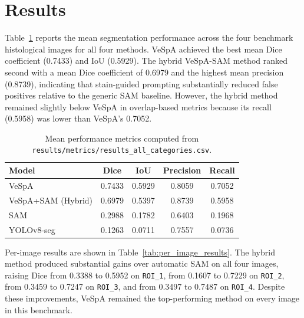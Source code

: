 \section{Results}

Table~\ref{tab:summary_metrics} reports the mean segmentation performance across the four benchmark histological images for all four methods. VeSpA achieved the best mean Dice coefficient (0.7433) and IoU (0.5929). The hybrid VeSpA-SAM method ranked second with a mean Dice coefficient of 0.6979 and the highest mean precision (0.8739), indicating that stain-guided prompting substantially reduced false positives relative to the generic SAM baseline. However, the hybrid method remained slightly below VeSpA in overlap-based metrics because its recall (0.5958) was lower than VeSpA's 0.7052.

\begin{table}[htbp]
\centering
\caption{Mean performance metrics computed from \texttt{results/metrics/results\_all\_categories.csv}.}
\label{tab:summary_metrics}
\begin{tabular}{lcccc}
\hline
Model & Dice & IoU & Precision & Recall \\
\hline
VeSpA & 0.7433 & 0.5929 & 0.8059 & 0.7052 \\
VeSpA+SAM (Hybrid) & 0.6979 & 0.5397 & 0.8739 & 0.5958 \\
SAM & 0.2988 & 0.1782 & 0.6403 & 0.1968 \\
YOLOv8-seg & 0.1263 & 0.0711 & 0.7557 & 0.0736 \\
\hline
\end{tabular}
\end{table}

Per-image results are shown in Table~\ref{tab:per_image_results}. The hybrid method produced substantial gains over automatic SAM on all four images, raising Dice from 0.3388 to 0.5952 on \texttt{ROI\_1}, from 0.1607 to 0.7229 on \texttt{ROI\_2}, from 0.3459 to 0.7247 on \texttt{ROI\_3}, and from 0.3497 to 0.7487 on \texttt{ROI\_4}. Despite these improvements, VeSpA remained the top-performing method on every image in this benchmark.

